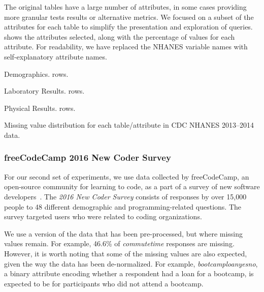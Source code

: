 The original tables have a large number of attributes, in some cases providing more granular tests results or alternative metrics.
We focused on a subset of the attributes for each table to simplify the presentation and exploration of queries.
 shows the attributes selected, along with the percentage of \nullv{} values for each attribute.
For readability, we have replaced the NHANES variable names with self-explanatory attribute names.

\begin{table}
  \centering
  \begin{subtable}{0.5\textwidth}
    \centering
    
    \caption{Demographics. \demorows{} rows.}
  \end{subtable}
  \par\medskip
  \begin{subtable}{0.5\textwidth}
    \centering
    
    \caption{Laboratory Results. \labexrows{} rows.}
  \end{subtable}
  \par\medskip  
  \begin{subtable}{0.5\textwidth}
    \centering
    
    \caption{Physical Results. \labexrows{} rows.}
  \end{subtable}
  \par\medskip  
  \caption{Missing value distribution for each table/attribute in CDC NHANES 2013--2014 data.}\label{table:nhanes-description} 
\end{table}

\subsubsection{freeCodeCamp 2016 New Coder Survey}
For our second set of experiments, we use data collected by freeCodeCamp, an open-source
community for learning to code, as a part of a survey of new software
developers~\cite{fcc-data}.  The \textit{2016 New Coder Survey} consists of responses by
over 15,000 people to 48 different demographic and programming-related questions.  The
survey targeted users who were related to coding organizations.

We use a version of the data that has been pre-processed, but where missing values remain.
For example, 46.6\% of \textit{commutetime} responses are missing. However, it is worth
noting that some of the missing values are also expected, given the way the data has been
de-normalized. For example, \textit{bootcamploanyesno}, a binary attribute encoding whether
a respondent had a loan for a bootcamp, is expected to be \nullv{} for participants who did not
attend a bootcamp.

